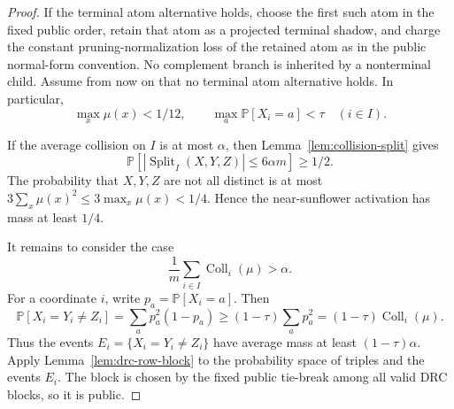 \documentclass[11pt]{article}
\newcommand{\Prb}{\mathbb P}
\newcommand{\Coll}{\operatorname{Coll}}
\newcommand{\Split}{\operatorname{Split}}
\begin{document}
\begin{proof}
If the terminal atom alternative holds, choose the first such atom in the fixed
public order, retain that atom as a projected terminal shadow, and charge the
constant pruning-normalization loss of the retained atom as in the public
normal-form convention.  No complement branch is inherited by a nonterminal
child.  Assume from now on that no terminal atom alternative holds.  In
particular,
\[
  \max_x\mu(x)<1/12,\qquad
  \max_a\Prb[X_i=a]<\tau\quad(i\in I).
\]

If the average collision on $I$ is at most $\alpha$, then
Lemma~\ref{lem:collision-split} gives
\[
  \Prb[|\Split_I(X,Y,Z)|\le 6\alpha m]\ge 1/2.
\]
The probability that $X,Y,Z$ are not all distinct is at most
$3\sum_x\mu(x)^2\le 3\max_x\mu(x)<1/4$.  Hence the near-sunflower activation
has mass at least $1/4$.

It remains to consider the case
\[
  \frac1m\sum_{i\in I}\Coll_i(\mu)>\alpha.
\]
For a coordinate $i$, write $p_a=\Prb[X_i=a]$.  Then
\[
  \Prb[X_i=Y_i\ne Z_i]
  =
  \sum_a p_a^2(1-p_a)
  \ge
  (1-\tau)\sum_a p_a^2
  =
  (1-\tau)\Coll_i(\mu).
\]
Thus the events $E_i=\{X_i=Y_i\ne Z_i\}$ have average mass at least
$(1-\tau)\alpha$.  Apply Lemma~\ref{lem:drc-row-block} to the probability
space of triples and the events $E_i$.  The block is chosen by the fixed
public tie-break among all valid DRC blocks, so it is public.
\end{proof}
\end{document}
